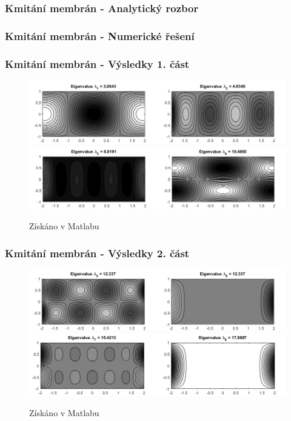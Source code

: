 \documentclass{beamer}
\begin{document}
\begin{frame}
\frametitle{Kmitání membrán - Analytický rozbor}
\end{frame}

\begin{frame}
\frametitle{Kmitání membrán - Numerické řešení}
\end{frame}

\begin{frame}
\frametitle{Kmitání membrán - Výsledky 1. část}
\centering
\begin{figure}
\includegraphics[width=1\linewidth]{obdelnicky1.png}
\includegraphics[width=1\linewidth]{obdelnicky2.png}
\caption{Získáno v Matlabu}
\end{figure}
\end{frame}

\begin{frame}
\frametitle{Kmitání membrán - Výsledky 2. část}
\centering
\begin{figure}
\includegraphics[width=1\linewidth]{obdelnicky3.png}
\includegraphics[width=1\linewidth]{obdelnicky4.png}
\caption{Získáno v Matlabu}
\end{figure}
\end{frame}
\end{document}
